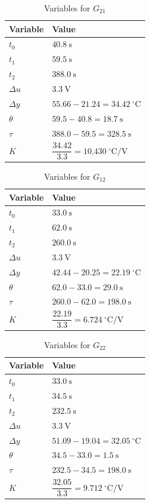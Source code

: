 \begin{table}[H]
\centering
\renewcommand{\arraystretch}{1.8}
\caption{Variables for $G_{21}$}
\begin{tabular}{ll}
\hline
Variable & Value \\
\hline
$t_0$ & $40.8\ \mathrm{s}$ \\
$t_1$ & $59.5\ \mathrm{s}$ \\
$t_2$ & $388.0\ \mathrm{s}$ \\
$\Delta u$ & $3.3\ \mathrm{V}$ \\
$\Delta y$ & $55.66 - 21.24 = 34.42\ ^\circ\mathrm{C}$ \\
$\theta$ & $59.5 - 40.8 = 18.7\ \mathrm{s}$ \\
$\tau$ & $388.0 - 59.5 = 328.5\ \mathrm{s}$ \\
$K$ & $\dfrac{34.42}{3.3} = 10.430\ ^\circ\mathrm{C}/\mathrm{V}$ \\[6pt]
\hline
\end{tabular}
\end{table}

\begin{table}[H]
\centering
\renewcommand{\arraystretch}{1.8}
\caption{Variables for $G_{12}$}
\begin{tabular}{ll}
\hline
Variable & Value \\
\hline
$t_0$ & $33.0\ \mathrm{s}$ \\
$t_1$ & $62.0\ \mathrm{s}$ \\
$t_2$ & $260.0\ \mathrm{s}$ \\
$\Delta u$ & $3.3\ \mathrm{V}$ \\
$\Delta y$ & $42.44 - 20.25 = 22.19\ ^\circ\mathrm{C}$ \\
$\theta$ & $62.0 - 33.0 = 29.0\ \mathrm{s}$ \\
$\tau$ & $260.0 - 62.0 = 198.0\ \mathrm{s}$ \\
$K$ & $\dfrac{22.19}{3.3} = 6.724\ ^\circ\mathrm{C}/\mathrm{V}$ \\[6pt]
\hline
\end{tabular}
\end{table}

\begin{table}[H]
\centering
\renewcommand{\arraystretch}{1.8}
\caption{Variables for $G_{22}$}
\begin{tabular}{ll}
\hline
Variable & Value \\
\hline
$t_0$ & $33.0\ \mathrm{s}$ \\
$t_1$ & $34.5\ \mathrm{s}$ \\
$t_2$ & $232.5\ \mathrm{s}$ \\
$\Delta u$ & $3.3\ \mathrm{V}$ \\
$\Delta y$ & $51.09 - 19.04 = 32.05\ ^\circ\mathrm{C}$ \\
$\theta$ & $34.5 - 33.0 = 1.5\ \mathrm{s}$ \\
$\tau$ & $232.5 - 34.5 = 198.0\ \mathrm{s}$ \\
$K$ & $\dfrac{32.05}{3.3} = 9.712\ ^\circ\mathrm{C}/\mathrm{V}$ \\[6pt]
\hline
\end{tabular}
\end{table}

